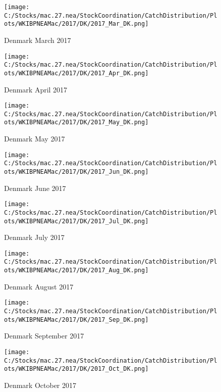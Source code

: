 \documentclass{article}
\begin{document}
\begin{figure}
	\centering
		\texttt{[image: C:/Stocks/mac.27.nea/StockCoordination/CatchDistribution/Plots/WKIBPNEAMac/2017/DK/2017\_Mar\_DK.png]}
	\caption{Denmark March 2017}
	\label{fig:2017_Mar_DK}
\end{figure}

\begin{figure}
	\centering
		\texttt{[image: C:/Stocks/mac.27.nea/StockCoordination/CatchDistribution/Plots/WKIBPNEAMac/2017/DK/2017\_Apr\_DK.png]}
	\caption{Denmark April 2017}
	\label{fig:2017_Apr_DK}
\end{figure}

\begin{figure}
	\centering
		\texttt{[image: C:/Stocks/mac.27.nea/StockCoordination/CatchDistribution/Plots/WKIBPNEAMac/2017/DK/2017\_May\_DK.png]}
	\caption{Denmark May 2017}
	\label{fig:2017_May_DK}
\end{figure}

\begin{figure}
	\centering
		\texttt{[image: C:/Stocks/mac.27.nea/StockCoordination/CatchDistribution/Plots/WKIBPNEAMac/2017/DK/2017\_Jun\_DK.png]}
	\caption{Denmark June 2017}
	\label{fig:2017_Jun_DK}
\end{figure}

\begin{figure}
	\centering
		\texttt{[image: C:/Stocks/mac.27.nea/StockCoordination/CatchDistribution/Plots/WKIBPNEAMac/2017/DK/2017\_Jul\_DK.png]}
	\caption{Denmark July 2017}
	\label{fig:2017_Jul_DK}
\end{figure}

\begin{figure}
	\centering
		\texttt{[image: C:/Stocks/mac.27.nea/StockCoordination/CatchDistribution/Plots/WKIBPNEAMac/2017/DK/2017\_Aug\_DK.png]}
	\caption{Denmark August 2017}
	\label{fig:2017_Aug_DK}
\end{figure}

\begin{figure}
	\centering
		\texttt{[image: C:/Stocks/mac.27.nea/StockCoordination/CatchDistribution/Plots/WKIBPNEAMac/2017/DK/2017\_Sep\_DK.png]}
	\caption{Denmark September 2017}
	\label{fig:2017_Sep_DK}
\end{figure}

\begin{figure}
	\centering
		\texttt{[image: C:/Stocks/mac.27.nea/StockCoordination/CatchDistribution/Plots/WKIBPNEAMac/2017/DK/2017\_Oct\_DK.png]}
	\caption{Denmark October 2017}
	\label{fig:2017_Oct_DK}
\end{figure}
\end{document}
